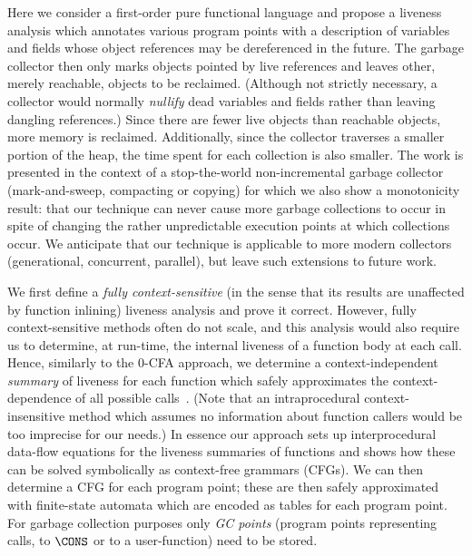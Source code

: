 \documentclass{llncs}
\begin{document}
Here we consider a first-order  pure functional language and propose a
liveness  analysis  which  annotates  various program  points  with  a
description  of variables and  fields whose  object references  may be
dereferenced  in the future.   The garbage  collector then  only marks
objects pointed by live references and leaves other, merely reachable,
objects  to  be  reclaimed.    (Although  not  strictly  necessary,  a
collector  would  normally {\em  nullify}  dead  variables and  fields
rather than leaving dangling  references.)  Since there are fewer live
objects   than   reachable   objects,   more  memory   is   reclaimed.
Additionally, since  the collector traverses a smaller  portion of the
heap, the time spent for each collection is also smaller.  The work is
presented in  the context of a  stop-the-world non-incremental garbage
collector (mark-and-sweep,  compacting or  copying) for which  we also
show a  monotonicity result: that  our technique can never  cause more
garbage  collections  to  occur   in  spite  of  changing  the  rather
unpredictable  execution  points   at  which  collections  occur.   We
anticipate that our technique  is applicable to more modern collectors
(generational,  concurrent, parallel),  but leave  such  extensions to
future work.

We first define a {\em fully context-sensitive} (in the sense that its
results  are unaffected  by function  inlining) liveness  analysis and
prove it  correct.  However, fully context-sensitive  methods often do
not scale,  and this analysis would  also require us  to determine, at
run-time,  the internal  liveness of  a  function body  at each  call.
Hence,   similarly   to   the   0-CFA   approach,   we   determine   a
context-independent {\em summary} of  liveness for each function which
safely   approximates   the   context-dependence   of   all   possible
calls~\cite{chatterjee99relevant,cherem07fast,lee05static}.       (Note
that  an intraprocedural context-insensitive  method which  assumes no
information  about function  callers would  be too  imprecise  for our
needs.)   In essence  our approach  sets up  interprocedural data-flow
equations for the liveness summaries  of functions and shows how these
can be solved symbolically  as context-free grammars (CFGs)\@.  We can
then determine  a CFG  for each program  point; these are  then safely
approximated with  finite-state automata  which are encoded  as tables
for each program point.  For  garbage collection purposes only {\em GC
  points}  (program points  representing  calls, to  $\CONS$  or to  a
user-function) need to be stored.
\end{document}
